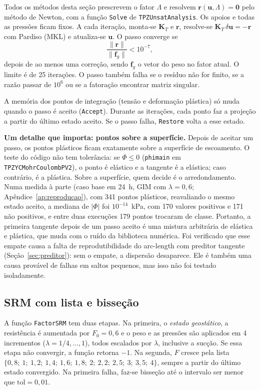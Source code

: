 \documentclass[11pt,a4paper]{article}
\numberwithin{equation}{section}
\begin{document}
Todos os métodos desta seção prescrevem o fator $\Lambda$ e resolvem $\mathbf{r}(\mathbf{u},\Lambda) = \mathbf{0}$ pelo método de Newton, com a
função \texttt{Solve} de \texttt{TPZUnsatAnalysis}. Os apoios e todas as pressões ficam fixos. A cada iteração, monta-se $\mathbf{K}_T$ e
$\mathbf{r}$, resolve-se $\mathbf{K}_T\,\delta\mathbf{u} = -\mathbf{r}$ com Pardiso (MKL) e atualiza-se $\mathbf{u}$. O passo converge se
\begin{equation}\label{eq:conv}
\frac{\|\mathbf{r}\|}{\|\mathbf{f}_g\|} < 10^{-7},
\end{equation}
depois de ao menos uma correção, sendo $\mathbf{f}_g$ o vetor do peso no fator atual. O limite é de 25 iterações. O passo também falha se o resíduo
não for finito, se a razão passar de $10^{6}$ ou se a fatoração encontrar matriz singular.

A memória dos pontos de integração (tensão e deformação plástica) só muda quando o passo é aceito (\texttt{Accept}). Durante as
iterações, cada ponto faz a projeção a partir do último estado aceito. Se o passo falha, \texttt{Restore} volta a esse estado.

\textbf{Um detalhe que importa: pontos sobre a superfície.} Depois de aceitar um passo, os pontos plásticos ficam exatamente sobre a
superfície de escoamento. O teste do código não tem tolerância: se $\Phi \le 0$ (\texttt{phimain} em \texttt{TPZYCMohrCoulombPV2}), o ponto é
elástico e a tangente é a elástica; caso contrário, é a plástica. Sobre a superfície, quem decide é o arredondamento. Numa medida à parte (caso base em 24~h, GIM com $\lambda = 0{,}6$; Apêndice~\ref{ap:reproducao}), com
341 pontos plásticos, reavaliando o mesmo estado aceito, a mediana de $|\Phi|$ foi $10^{-14}$~kPa, com 170 valores positivos e 171 não
positivos, e entre duas execuções 179 pontos trocaram de classe. Portanto, a primeira tangente depois de um passo aceito é uma mistura
arbitrária de elástica e plástica, que muda com o ruído da biblioteca numérica. Foi verificado que esse empate causa a falta de reprodutibilidade do arc-length com preditor tangente (Seção~\ref{sec:preditor}): sem o empate, a dispersão desaparece. Ele é também uma causa provável de falhas em saltos pequenos, mas isso não foi testado isoladamente.

\subsection{SRM com lista e bisseção}\label{sec:srm_lista}

A função \texttt{FactorSRM} tem duas etapas. Na primeira, o \emph{estado geostático}, a resistência é aumentada por $F_0 = 0{,}6$ e o peso e as pressões
são aplicados em 4 incrementos ($\lambda = 1/4, \dots, 1$), todos escalados por $\lambda$, inclusive a sucção. Se essa etapa não convergir, a função
retorna $-1$. Na segunda, $F$ cresce pela lista $\{0{,}8;\ 1;\ 1{,}2;\ 1{,}4;\ 1{,}6;\ 1{,}8;\ 2;\ 2{,}2;\ 2{,}5;\ 3;\ 3{,}5;\ 4\}$, sempre a partir do último estado
convergido. Na primeira falha, faz-se bisseção até o intervalo ser menor que $\mathrm{tol} = 0{,}01$.
\end{document}
